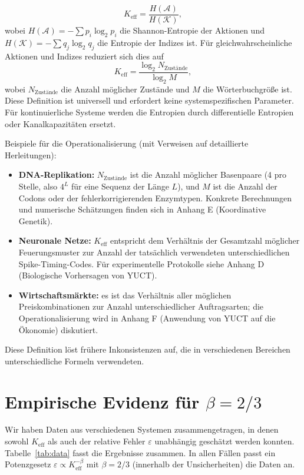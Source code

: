 \documentclass[12pt]{article}
\newcommand{\Keff}{K_{\mathrm{eff}}}
\newcommand{\eps}{\varepsilon}
\begin{document}
	\begin{equation}
		\Keff = \frac{H(\mathcal{A})}{H(\mathcal{K})},
		\label{eq:keff}
	\end{equation}
	wobei \(H(\mathcal{A}) = -\sum p_i \log_2 p_i\) die Shannon-Entropie der Aktionen und \(H(\mathcal{K}) = -\sum q_j \log_2 q_j\) die Entropie der Indizes ist. Für gleichwahrscheinliche Aktionen und Indizes reduziert sich dies auf
	\begin{equation}
		\Keff = \frac{\log_2 N_{\text{Zustände}}}{\log_2 M},
		\label{eq:keff-simple}
	\end{equation}
	wobei \(N_{\text{Zustände}}\) die Anzahl möglicher Zustände und \(M\) die Wörterbuchgröße ist. Diese Definition ist universell und erfordert keine systemspezifischen Parameter. Für kontinuierliche Systeme werden die Entropien durch differentielle Entropien oder Kanalkapazitäten ersetzt.
	
	Beispiele für die Operationalisierung (mit Verweisen auf detaillierte Herleitungen):
	\begin{itemize}
		\item \textbf{DNA-Replikation:} \(N_{\text{Zustände}}\) ist die Anzahl möglicher Basenpaare (4 pro Stelle, also \(4^L\) für eine Sequenz der Länge \(L\)), und \(M\) ist die Anzahl der Codons oder der fehlerkorrigierenden Enzymtypen. Konkrete Berechnungen und numerische Schätzungen finden sich in Anhang E (Koordinative Genetik).
		\item \textbf{Neuronale Netze:} \(\Keff\) entspricht dem Verhältnis der Gesamtzahl möglicher Feuerungsmuster zur Anzahl der tatsächlich verwendeten unterschiedlichen Spike-Timing-Codes. Für experimentelle Protokolle siehe Anhang D (Biologische Vorhersagen von YUCT).
		\item \textbf{Wirtschaftsmärkte:} es ist das Verhältnis aller möglichen Preiskombinationen zur Anzahl unterschiedlicher Auftragsarten; die Operationalisierung wird in Anhang F (Anwendung von YUCT auf die Ökonomie) diskutiert.
	\end{itemize}
	Diese Definition löst frühere Inkonsistenzen auf, die in verschiedenen Bereichen unterschiedliche Formeln verwendeten.
	
	\section{Empirische Evidenz für \(\beta = 2/3\)}
	\label{sec:evidence}
	
	Wir haben Daten aus verschiedenen Systemen zusammengetragen, in denen sowohl \(\Keff\) als auch der relative Fehler \(\eps\) unabhängig geschätzt werden konnten. Tabelle~\ref{tab:data} fasst die Ergebnisse zusammen. In allen Fällen passt ein Potenzgesetz \(\eps \propto \Keff^{-\beta}\) mit \(\beta = 2/3\) (innerhalb der Unsicherheiten) die Daten an.
	
\end{document}
